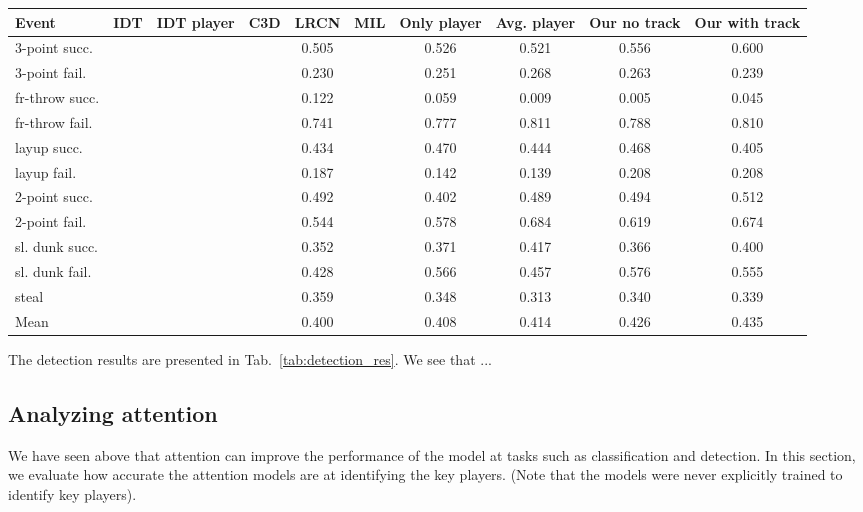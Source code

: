 \begin{table*}[ht!]
\begin{center}
\small
 \begin{tabular}{|l|c|c|c|c|c|c|c|c|c|}
  \hline
Event & IDT\cite{Wang_CVPR11} & IDT player\cite{Wang_CVPR11} & C3D \cite{Tran_arxiv14} & LRCN \cite{Donahue_arxiv14} & MIL\cite{} & Only player & Avg. player & Our no track & Our with track \\ \hline \hline
3-point succ.  &  &  &  & 0.505 &  & 0.526 & 0.521 & 0.556 & 0.600 \\
3-point fail.  &  &  &  & 0.230 &  & 0.251 & 0.268 & 0.263 & 0.239 \\
fr-throw succ. &  &  &  & 0.122 &  & 0.059 & 0.009 & 0.005 & 0.045 \\
fr-throw fail. &  &  &  & 0.741 &  & 0.777 & 0.811 & 0.788 & 0.810 \\
layup succ.    &  &  &  & 0.434 &  & 0.470 & 0.444 & 0.468 & 0.405 \\
layup fail.    &  &  &  & 0.187 &  & 0.142 & 0.139 & 0.208 & 0.208 \\
2-point succ.  &  &  &  & 0.492 &  & 0.402 & 0.489 & 0.494 & 0.512 \\
2-point fail.  &  &  &  & 0.544 &  & 0.578 & 0.684 & 0.619 & 0.674 \\
sl. dunk succ. &  &  &  & 0.352 &  & 0.371 & 0.417 & 0.366 & 0.400 \\
sl. dunk fail. &  &  &  & 0.428 &  & 0.566 & 0.457 & 0.576 & 0.555 \\
steal          &  &  &  & 0.359 &  & 0.348 & 0.313 & 0.340 & 0.339 \\ \hline \hline
Mean             &  &  &  & 0.400 &  & 0.408 & 0.414 & 0.426 & 0.435 \\ \hline
  \end{tabular}
\end{center}
  \caption{Mean average precision for event {\em detection} given
    untrimmed videos.}
  \label{tab:detection_res}
\end{table*}

 The detection results
are presented in Tab.~\ref{tab:detection_res}.
We see that  ...


\subsection{Analyzing attention}

We have seen above that attention can improve the performance of the model at tasks such as classification and detection.
In this section, we evaluate how accurate the attention models are at
identifying the key players. (Note that the models were never
explicitly trained to identify key players).

